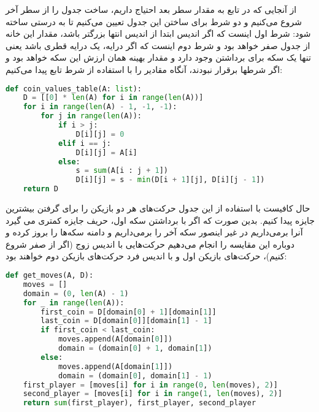 \documentclass[]{article}
\begin{document}
از آنجایی که در تابع به مقدار سطر بعد احتیاج داریم، ساخت جدول را از سطر آخر شروع می‌کنیم
و دو شرط برای ساختن این جدول تعیین می‌کنیم تا به درستی ساخته شود:
شرط اول اینست که اگر اندیس ابتدا از اندیس انتها بزرگتر باشد، مقدار این خانه از جدول صفر خواهد بود
و شرط دوم اینست که اگر درایه‌، یک درایه قطری باشد یعنی تنها یک سکه برای برداشتن وجود دارد
و مقدار بهینه همان ارزش این سکه خواهد بود و اگر شرطها برقرار نبودند، آنگاه
مقادیر را با استفاده از شرط تابع پیدا می‌کنیم:
\pagebreak
\begin{latin}
    \begin{lstlisting}[language=python]
def coin_values_table(A: list):
    D = [[0] * len(A) for i in range(len(A))]
    for i in range(len(A) - 1, -1, -1):
        for j in range(len(A)):
            if i > j:
                D[i][j] = 0
            elif i == j:
                D[i][j] = A[i]
            else:
                s = sum(A[i : j + 1])
                D[i][j] = s - min(D[i + 1][j], D[i][j - 1])
    return D
    \end{lstlisting}
\end{latin}
حال کافیست با استفاده از این جدول حرکت‌های هر دو بازیکن را برای گرفتن بیشترین جایزه پیدا کنیم.
بدین صورت که اگر با برداشتن سکه اول، حریف جایزه کمتری می گیرد آنرا برمی‌داریم در غیر اینصور سکه
آخر را برمی‌داریم و دامنه سکه‌ها را بروز کرده و دوباره این مقایسه را انجام می‌دهیم
حرکت‌هایی با اندیس زوج (اگر از صفر شروع کنیم)، حرکت‌های بازیکن اول و با اندیس فرد حرکت‌های بازیکن دوم خواهند بود:
\begin{latin}
    \begin{lstlisting}[language=python]
def get_moves(A, D):
    moves = []
    domain = (0, len(A) - 1)
    for _ in range(len(A)):
        first_coin = D[domain[0] + 1][domain[1]]
        last_coin = D[domain[0]][domain[1] - 1]
        if first_coin < last_coin:
            moves.append(A[domain[0]])
            domain = (domain[0] + 1, domain[1])
        else:
            moves.append(A[domain[1]])
            domain = (domain[0], domain[1] - 1)
    first_player = [moves[i] for i in range(0, len(moves), 2)]
    second_player = [moves[i] for i in range(1, len(moves), 2)]
    return sum(first_player), first_player, second_player
    \end{lstlisting}
\end{latin}
\end{document}
